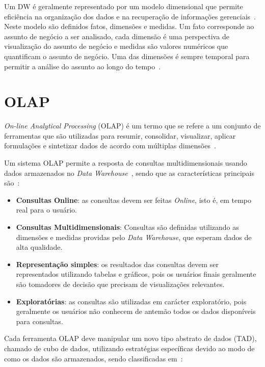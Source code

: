 Um DW é geralmente representado por um modelo dimensional que permite eficiência na organização dos dados e na recuperação de informações gerenciais~\cite{kimballDataWarehouseToolkit2013}.
Neste modelo são definidos fatos, dimensões e medidas.
Um fato corresponde ao assunto de negócio a ser analisado, cada dimensão é uma perspectiva de visualização do assunto de negócio e medidas são valores numéricos que quantificam o assunto de negócio.
Uma das dimensões é sempre temporal para permitir a análise do assunto ao longo do tempo~\cite{silva:2015:abordagensParaCubo}.

\section{OLAP}\label{ch:fun:olap}

\textit{On-line Analytical Processing} (OLAP) é um termo que se refere a um conjunto de ferramentas que são utilizadas para resumir, consolidar, visualizar, aplicar formulações e sintetizar dados de acordo com múltiplas dimensões~\cite{coddProvidingOlapUseranalysts1998}.

Um sistema OLAP permite a resposta de consultas multidimensionais usando dados armazenados no \textit{Data Warehouse}~\cite{kimballDataWarehouseToolkit2013}, sendo que as características principais são~\cite{bimonteOpenIssuesBig2016}:

\begin{itemize}
	\item \textbf{Consultas Online}: as consultas devem ser feitas \textit{Online}, isto é, em tempo real para o usuário.
	\item \textbf{Consultas Multidimensionais}: Consultas são definidas utilizando as dimensões e medidas providas pelo \textit{Data Warehouse}, que esperam dados de alta qualidade.
	\item \textbf{Representação simples}: os resultados das consultas devem ser representados utilizando tabelas e gráficos, pois os usuários finais geralmente são tomadores de decisão que precisam de visualizações relevantes.
	\item \textbf{Exploratórias}: as consultas são utilizadas em carácter exploratório, pois geralmente os usuários não conhecem de antemão todos os dados disponíveis para consultas.
\end{itemize}

Cada ferramenta OLAP deve manipular um novo tipo abstrato de dados (TAD), chamado de cubo de dados, utilizando estratégias específicas devido ao modo de como os dados são armazenados, sendo classificadas em~\cite{moreiraFullPartialData2012}:

